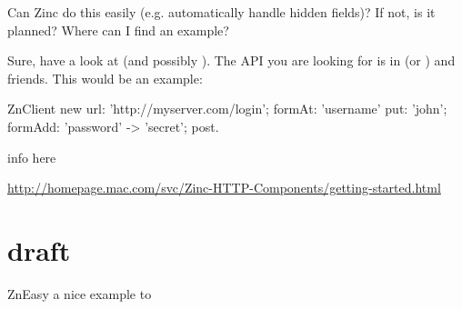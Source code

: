 \documentclass[a4paper,10pt,twoside]{book}
\begin{document}
%
%

Can Zinc do this easily (e.g. automatically handle hidden fields)? If not, is
it planned? Where can I find an example?

Sure, have a look at  (and possibly ).
The API you are looking for is in  (or ) and friends.
This would be an example:

\begin{code}{}
ZnClient new
	url: 'http://myserver.com/login';
	formAt: 'username' put: 'john';
	formAdd: 'password' -> 'secret';
	post.
\end{code}

info here

\url{http://homepage.mac.com/svc/Zinc-HTTP-Components/getting-started.html}


\section{draft}
ZnEasy a nice example to 
\end{document}
